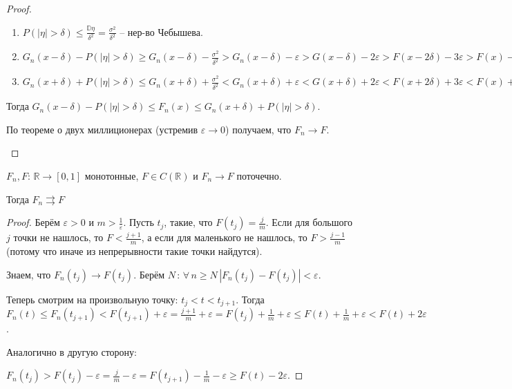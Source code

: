 \begin{proof}
\begin{enumerate}
{            \begin{enumerate}
                \item {
                    $P(|\eta| > \delta) \leqslant \frac{\mathbb{D} \eta}{\delta^2} = \frac{\sigma^2}{\delta^2}$ -- нер-во Чебышева.
                }
                \item {
                    $G_{n} (x - \delta) - P(|\eta| > \delta) \geq G_n (x - \delta) - \frac{\sigma^2}{\delta^2} > G_n (x - \delta) - \varepsilon > G(x - \delta) - 2\varepsilon > F(x - 2\delta) - 3\varepsilon > F(x) - 4\varepsilon$
                }
                \item {
                    $G_{n} (x + \delta) + P(|\eta| > \delta) \leq G_n (x + \delta) + \frac{\sigma^2}{\delta^2} < G_n (x + \delta) + \varepsilon < G(x + \delta) + 2\varepsilon < F(x + 2\delta) + 3\varepsilon < F(x) + 4\varepsilon$
                }
            \end{enumerate}

            Тогда $G_{n} (x - \delta) - P(|\eta| > \delta) \leqslant F_n (x) \leqslant G_{n} (x + \delta) + P(|\eta| > \delta)$.

            По теореме о двух миллиционерах (устремив $\varepsilon \to 0$) получаем, что $F_n \to F$.
        }
    \end{enumerate}
\end{proof}

\begin{theorem}
    $F_n, F: \, \mathbb{R} \to [0, 1]$ монотонные, $F \in C(\mathbb{R})$ и
    $F_n \to F$ поточечно.

    Тогда $F_n \rightrightarrows F$
\end{theorem}

\begin{proof}
    Берём $\varepsilon > 0$ и $m > \frac{1}{\varepsilon}$. Пусть $t_j$, такие, что $F(t_j) = \frac{j}{m}$. Если для большого $j$ точки не нашлось, то
    $F < \frac{j + 1}{m}$, а если для маленького не нашлось, то $F > \frac{j - 1}{m}$ (потому что иначе из непрерывности такие точки найдутся).

    Знаем, что $F_n(t_j) \rightarrow F(t_j)$. Берём $N \, : \, \forall \, n \geqslant N \, |F_n(t_j) - F(t_j)| < \varepsilon$.

    Теперь смотрим на произвольную точку: $t_j < t < t_{j + 1}$. Тогда
    $F_n(t) \leqslant F_n(t_{j + 1}) < F(t_{j + 1}) + \varepsilon = \frac{j + 1}{m} + \varepsilon = F(t_j) + \frac{1}{m} + \varepsilon \leqslant F(t) + \frac{1}{m} + \varepsilon < F(t) + 2\varepsilon$.

    Аналогично в другую сторону:

    $F_n (t_j) > F(t_j) - \varepsilon = \frac{j}{m} - \varepsilon = F(t_{j + 1}) - \frac{1}{m} - \varepsilon \geqslant F(t) - 2\varepsilon$.

\end{proof}

